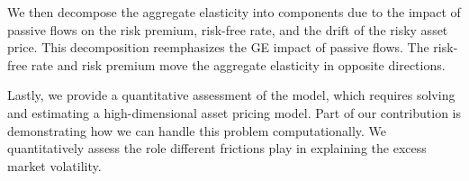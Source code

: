 
We then decompose the aggregate elasticity into components due to the impact of passive flows on the risk premium, risk-free rate, and the drift of the risky asset price. This decomposition reemphasizes the GE impact of passive flows. The risk-free rate and risk premium move the aggregate elasticity in opposite directions. 


Lastly, we provide a quantitative assessment of the model, which requires solving and estimating a high-dimensional asset pricing model. Part of our contribution is demonstrating how we can handle this problem computationally. We quantitatively assess the role different frictions play in explaining the excess market volatility. %


